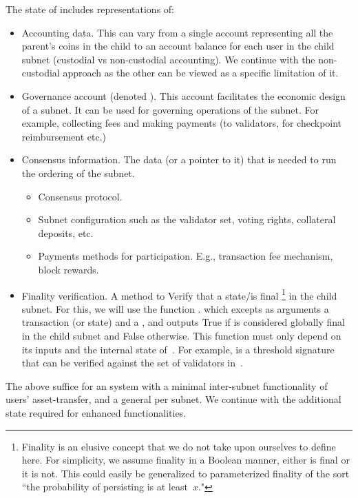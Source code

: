 The state of \sa includes representations of:
\begin{itemize}
    \item Accounting data. This can vary from a single account representing all the parent's coins in the child to an account balance for each user in the child subnet (custodial vs non-custodial accounting). We continue with the non-custodial approach as the other can be viewed as a specific limitation of it.
    \item Governance account (denoted \gov). This account facilitates the economic design of a subnet. It can be used for governing operations of the subnet. For example, collecting fees and making payments (to validators, for checkpoint reimbursement etc.) 
    \item Consensus information. The data (or a pointer to it) that is needed to run the ordering of the subnet.
    \begin{itemize}
        \item Consensus protocol.
        \item Subnet configuration such as the validator set, voting rights, collateral deposits, etc.
        \item Payments methods for participation. E.g., transaction fee mechanism, block rewards.
    \end{itemize}
    \item Finality verification. A method to Verify that a state/\tx is final%
    \footnote{Finality is an elusive concept that we do not take upon ourselves to define here. For simplicity, we assume finality in a Boolean manner, either \tx is final or it is not. This could easily be generalized to parameterized finality of the sort ``the probability of \tx persisting is at least~$x$."}
    in the child subnet. For this, we will use the function \sa.\verifyGfinal{\tx}{\prf} which excepts as arguments a transaction (or state) and a \prf, and outputs True if \tx is considered globally final in the child subnet and False otherwise. This function must only depend on its inputs and the internal state of~\sa. For example, \prf is a threshold signature that can be verified against the set of validators in~\sa.
\end{itemize}
%
The above suffice for an \nameFull system with a minimal inter-subnet functionality of users' asset-transfer, and a general \smr per subnet. We continue with the additional state required for enhanced functionalities.
